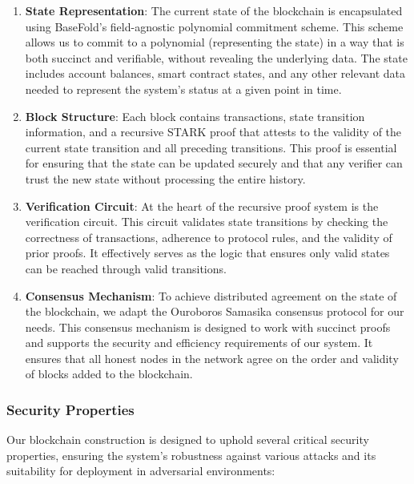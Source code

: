 \documentclass{article}
\theoremstyle{plain}
\theoremstyle{definition}
\theoremstyle{remark}
\theoremstyle{problem}
\begin{document}
\begin{enumerate}
    \item \textbf{State Representation}: The current state of the blockchain is encapsulated using BaseFold's field-agnostic polynomial commitment scheme. This scheme allows us to commit to a polynomial (representing the state) in a way that is both succinct and verifiable, without revealing the underlying data. The state includes account balances, smart contract states, and any other relevant data needed to represent the system's status at a given point in time.

    \item \textbf{Block Structure}: Each block contains transactions, state transition information, and a recursive STARK proof that attests to the validity of the current state transition and all preceding transitions. This proof is essential for ensuring that the state can be updated securely and that any verifier can trust the new state without processing the entire history.

    \item \textbf{Verification Circuit}: At the heart of the recursive proof system is the verification circuit. This circuit validates state transitions by checking the correctness of transactions, adherence to protocol rules, and the validity of prior proofs. It effectively serves as the logic that ensures only valid states can be reached through valid transitions.

    \item \textbf{Consensus Mechanism}: To achieve distributed agreement on the state of the blockchain, we adapt the Ouroboros Samasika consensus protocol for our needs. This consensus mechanism is designed to work with succinct proofs and supports the security and efficiency requirements of our system. It ensures that all honest nodes in the network agree on the order and validity of blocks added to the blockchain.
\end{enumerate}

\subsubsection{Security Properties}

Our blockchain construction is designed to uphold several critical security properties, ensuring the system's robustness against various attacks and its suitability for deployment in adversarial environments:
\end{document}
